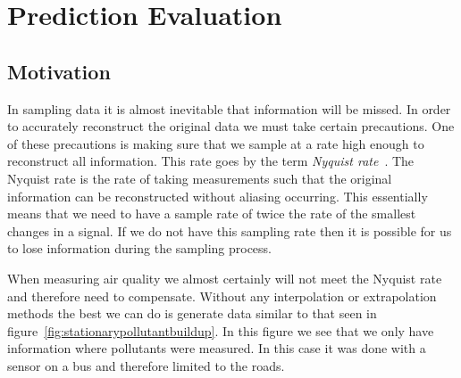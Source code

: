 \chapter{Prediction Evaluation}\label{prediction_evaluation}


	\section{Motivation}\label{prediction_evaluation_motivation}

		In sampling data it is almost inevitable that information will be missed. In order to accurately reconstruct the original data we must take certain precautions. One of these precautions is making sure that we sample at a rate high enough to reconstruct all information. This rate goes by the term \emph{Nyquist rate}~\cite{nyquistrate}. The Nyquist rate is the rate of taking measurements such that the original information can be reconstructed without aliasing occurring. This essentially means that we need to have a sample rate of twice the rate of the smallest changes in a signal. If we do not have this sampling rate then it is possible for us to lose information during the sampling process. 


		When measuring air quality we almost certainly will not meet the Nyquist rate and therefore need to compensate. Without any interpolation or extrapolation methods the best we can do is generate data similar to that seen in figure~\ref{fig:stationarypollutantbuildup}. In this figure we see that we only have information where pollutants were measured. In this case it was done with a sensor on a bus and therefore limited to the roads. 



